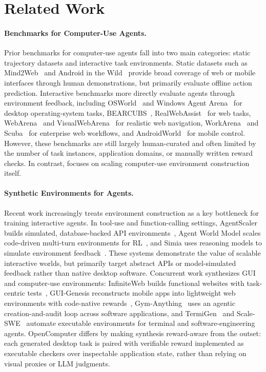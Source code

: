 \section{Related Work}
\label{sec:related-work}
\paragraph{Benchmarks for Computer-Use Agents.}
Prior benchmarks for computer-use agents fall into two main categories: static trajectory datasets and interactive task environments. Static datasets such as
Mind2Web~\citep{deng2023mind2web} and Android in the Wild~\citep{rawles2023androidinthewild} provide broad coverage of web or mobile interfaces through human demonstrations, but primarily evaluate offline action
prediction. Interactive benchmarks more directly evaluate agents through environment feedback, including OSWorld~\citep{xie2024osworld} and Windows Agent Arena~\citep{bonatti2024windows} for desktop operating-system tasks, BEARCUBS~\citep{song2025bearcubs}, RealWebAssist~\citep{ye2026realwebassist}
for web tasks, WebArena~\citep{zhou2023webarena} and VisualWebArena~\citep{koh2024visualwebarena} for realistic web navigation, WorkArena~\citep{drouin2024workarena} and Scuba~\citep{dai2025scuba} for enterprise web workflows, and AndroidWorld~\citep{rawles2024androidworld} for mobile control.
However, these benchmarks are still largely human-curated and often limited by the number of task instances, application domains, or manually written reward checks. In contrast, \ours focuses on scaling computer-use environment construction itself.


\paragraph{Synthetic Environments for Agents.}
Recent work increasingly treats environment construction as a key bottleneck for
training interactive agents. In tool-use and function-calling settings,
AgentScaler builds simulated, database-backed API environments~\citep{fang2025towards},
Agent World Model scales code-driven multi-turn environments for RL~\citep{wang2026agent},
and Simia uses reasoning models to simulate environment feedback~\citep{li2025simulating}.
These systems demonstrate the value of scalable interactive worlds, but primarily target
abstract APIs or model-simulated feedback rather than native desktop software. Concurrent work synthesizes GUI and computer-use environments: InfiniteWeb builds
functional websites with task-centric tests~\citep{zhang2026infiniteweb}, GUI-Genesis
reconstructs mobile apps into lightweight web environments with code-native rewards~\citep{cao2026gui},
Gym-Anything~\citep{aggarwal2026gym} uses an agentic creation-and-audit loop across software applications,
and TermiGen~\citep{zhu2026termigen} and Scale-SWE~\citep{zhao2026immersion} automate executable environments for terminal and software-engineering agents. OpenComputer differs by making synthesis reward-aware from the outset: each generated desktop task is paired with verifiable reward implemented as executable checkers over inspectable application state,
rather than relying on visual proxies or LLM judgments.